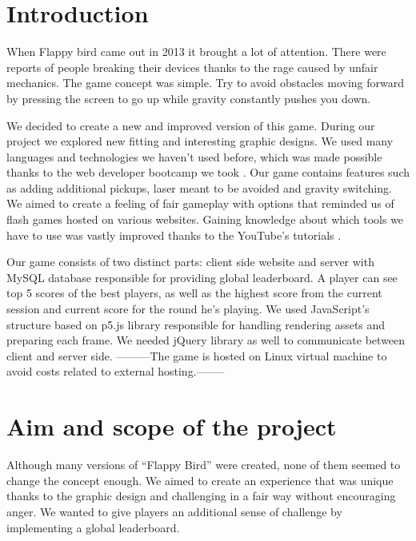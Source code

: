 \documentclass[oneside,a4paper,11pt]{report}
\begin{document}







\chapter{Introduction}
When Flappy bird came out in 2013 it brought a lot of attention. There were reports of people breaking their devices thanks to the rage caused by unfair mechanics. The game concept was simple. Try to avoid obstacles moving forward by pressing the screen to go up while gravity constantly pushes you down.

\par
We decided to create a new and improved version of this game. During our project we explored new fitting and interesting graphic designs. We used many languages and technologies we haven't used before, which was made possible thanks to the web developer bootcamp we took \cite{Bootcamp}. Our game contains features such as adding additional pickups, laser meant to be avoided and gravity switching. We aimed to create a feeling of fair gameplay with options that reminded us of flash games hosted on various websites. Gaining knowledge about which tools we have to use was vastly improved thanks to the
YouTube's tutorials \cite{CodingTrain} \cite{Phpcourse} \cite{ProgrammingwithMosh}.


\par
Our game consists of two distinct parts: client side website and server with MySQL database responsible for providing global leaderboard. A player can see top 5 scores of the best players, as well as the highest score from the current session and current score for the round he's playing. We used JavaScript's structure based on p5.js library responsible for handling rendering assets and preparing each frame. We needed jQuery library as well to communicate between client and server side. ---------The game is hosted on Linux virtual machine to avoid costs related to external hosting.--------


\chapter{Aim and scope of the project}

Although many versions of “Flappy Bird” were created, none of them seemed to change the concept enough. We aimed to create an experience that was unique thanks to the graphic design and challenging in a fair way without encouraging anger. We wanted to give players an additional sense of challenge by implementing a global leaderboard.
\end{document}
